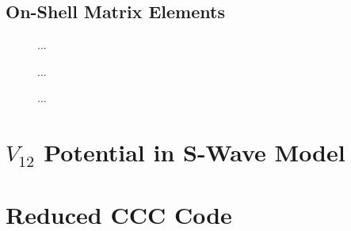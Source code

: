 \documentclass{article}
\begin{document}
\clearpage

\subsection{On-Shell Matrix Elements}
\label{sec:on-me}

\begin{figure}[h]
  \begin{center}
    
  \end{center}
  \caption[On-Shell Matrix Elements 1s-1s]{
    ...
  }
  \label{fig:on-me-1s-1s}
\end{figure}

\begin{figure}[h]
  \begin{center}
    
  \end{center}
  \caption[On-Shell Matrix Elements 1s-2s]{
    ...
  }
  \label{fig:on-me-1s-2s}
\end{figure}

\begin{figure}[h]
  \begin{center}
    
  \end{center}
  \caption[On-Shell Matrix Elements 1s-3s]{
    ...
  }
  \label{fig:on-me-1s-3s}
\end{figure}

\clearpage

\section{$V_{1 2}$ Potential in S-Wave Model}
\label{sec:v12-swave}

\section{Reduced CCC Code}
\label{sec:reduced-ccc-code}
\end{document}
